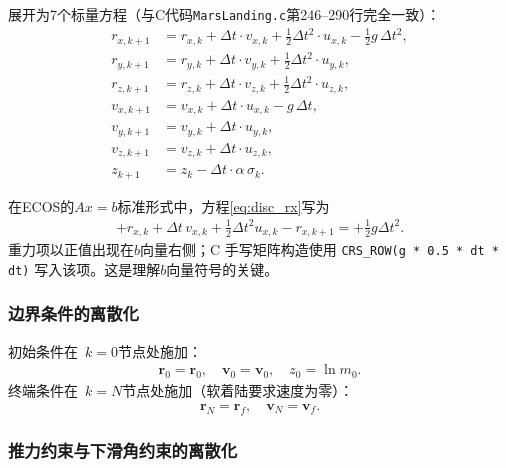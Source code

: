 展开为7个标量方程（与C代码\lstinline{MarsLanding.c}第246--290行完全一致）：
\begin{align}
r_{x,k+1} &= r_{x,k} + \Delta t\cdot v_{x,k} + \tfrac{1}{2}\Delta t^2\cdot u_{x,k} - \tfrac{1}{2}g\,\Delta t^2, \label{eq:disc_rx} \\
r_{y,k+1} &= r_{y,k} + \Delta t\cdot v_{y,k} + \tfrac{1}{2}\Delta t^2\cdot u_{y,k}, \\
r_{z,k+1} &= r_{z,k} + \Delta t\cdot v_{z,k} + \tfrac{1}{2}\Delta t^2\cdot u_{z,k}, \\[4pt]
v_{x,k+1} &= v_{x,k} + \Delta t\cdot u_{x,k} - g\,\Delta t, \label{eq:disc_vx} \\
v_{y,k+1} &= v_{y,k} + \Delta t\cdot u_{y,k}, \\
v_{z,k+1} &= v_{z,k} + \Delta t\cdot u_{z,k}, \\[4pt]
z_{k+1} &= z_k - \Delta t\cdot\alpha\,\sigma_k. \label{eq:disc_z_scalar}
\end{align}

在ECOS的$Ax=b$标准形式中，方程\eqref{eq:disc_rx}写为
\begin{align}
    +r_{x,k} + \Delta t\,v_{x,k} + \frac{1}{2}\Delta t^2 u_{x,k} - r_{x,k+1}
    = +\frac{1}{2}g\Delta t^2.
\end{align}
重力项以正值出现在$b$向量右侧；C 手写矩阵构造使用 \lstinline{CRS_ROW(g * 0.5 * dt * dt)} 写入该项。这是理解$b$向量符号的关键。

\subsubsection{边界条件的离散化}

初始条件在~$k=0$节点处施加：
\begin{align}
\bm r_0 = \bm r_0,\quad \bm v_0 = \bm v_0,\quad z_0 = \ln m_0.
\end{align}
终端条件在~$k=N$节点处施加（软着陆要求速度为零）：
\begin{align}
\bm r_N = \bm r_f,\quad \bm v_N = \bm v_f.
\end{align}

\subsubsection{推力约束与下滑角约束的离散化}

